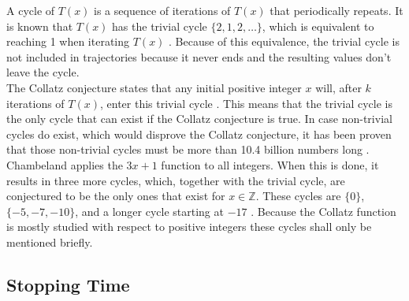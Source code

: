 \documentclass[12pt,a4paper,reqno]{amsart}
\begin{document}
A cycle of $T(x)$ is a sequence of iterations of $T(x)$ that periodically 
repeats. It is known that $T(x)$ has the trivial cycle $\{2,1,2,\dots\}$, which 
is equivalent to reaching 1 when iterating $T(x)$ \cite{src:chamberland}. 
Because of this equivalence, the trivial cycle is not included in trajectories 
because it never ends and the resulting values don't leave the cycle. \\
The Collatz conjecture states that any initial positive integer $x$ will, after 
$k$ iterations of $T(x)$, enter this trivial cycle \cite{src:chamberland}. This 
means that the trivial cycle is the only cycle that can exist if the Collatz 
conjecture is true. In case non-trivial cycles do exist, which would disprove 
the Collatz conjecture, it has been proven that those non-trivial cycles must 
be more than 10.4 billion numbers long \cite{src:lagarias}. \\
Chambeland \cite{src:chamberland} applies the $3x+1$ function to all integers. 
When this is done, it results in three more cycles, which, together with the 
trivial cycle, are conjectured to be the only ones that exist for 
$x \in \mathbb{Z}$. These cycles are $\{0\}$, $\{-5,-7,-10\}$, and a longer 
cycle starting at $-17$ \cite{src:chamberland}. Because the Collatz function is 
mostly studied with respect to positive integers these cycles shall only be 
mentioned briefly.

\subsection{Stopping Time}
\end{document}
